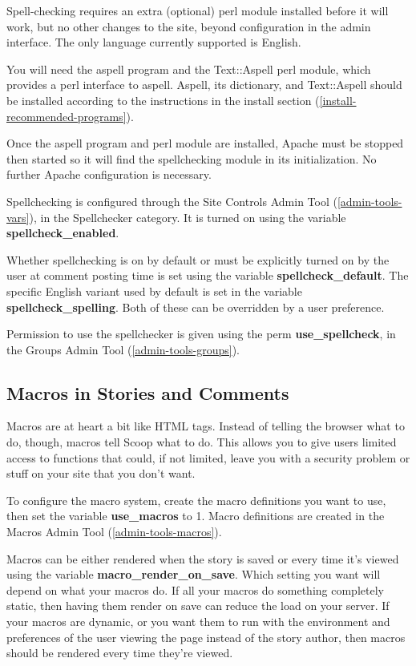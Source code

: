 Spell-checking requires an extra (optional) perl module installed before it will work, but no other changes to the site, beyond configuration in the admin interface.  The only language currently supported is English.

You will need the aspell program and the Text::Aspell perl module, which provides a perl interface to aspell.  Aspell, its dictionary, and Text::Aspell should be installed according to the instructions in the install section (\ref{install-recommended-programs}).

Once the aspell program and perl module are installed, Apache must be stopped then started so it will find the spellchecking module in its initialization.  No further Apache configuration is necessary.

Spellchecking is configured through the Site Controls Admin Tool (\ref{admin-tools-vars}), in the Spellchecker category.  It is turned on using the variable {\bf spellcheck\_enabled}.

Whether spellchecking is on by default or must be explicitly turned on by the user at comment posting time is set using the variable {\bf spellcheck\_default}.  The specific English variant used by default is set in the variable {\bf spellcheck\_spelling}.  Both of these can be overridden by a user preference.

Permission to use the spellchecker is given using the perm {\bf use\_spellcheck}, in the Groups Admin Tool (\ref{admin-tools-groups}).

\subsection{Macros in Stories and Comments}
\label{features-macros}

Macros are at heart a bit like HTML tags. Instead of telling the browser what to do, though, macros tell Scoop what to do. This allows you to give users limited access to functions that could, if not limited, leave you with a security problem or stuff on your site that you don't want.

To configure the macro system, create the macro definitions you want to use, then set the variable {\bf use\_macros} to 1. Macro definitions are created in the Macros Admin Tool (\ref{admin-tools-macros}).

Macros can be either rendered when the story is saved or every time it's viewed using the variable {\bf macro\_render\_on\_save}. Which setting you want will depend on what your macros do. If all your macros do something completely static, then having them render on save can reduce the load on your server. If your macros are dynamic, or you want them to run with the environment and preferences of the user viewing the page instead of the story author, then macros should be rendered every time they're viewed.


